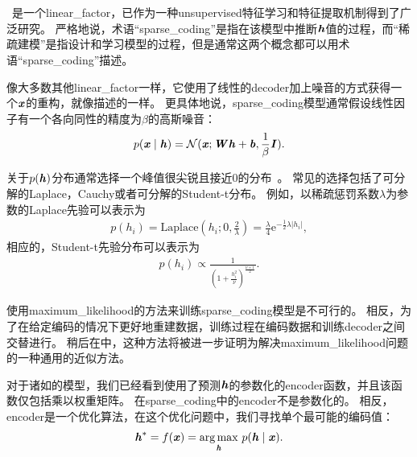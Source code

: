 \section{}
\label{sec:sparse_coding}


~\citep{Olshausen+Field-1996}是一个\gls{linear_factor}，已作为一种\gls{unsupervised}特征学习和特征提取机制得到了广泛研究。
严格地说，术语``\gls{sparse_coding}''是指在该模型中推断$\boldsymbol{\mathit{h}}$值的过程，而``稀疏建模''是指设计和学习模型的过程，但是通常这两个概念都可以用术语``\gls{sparse_coding}''描述。

像大多数其他\gls{linear_factor}一样，它使用了线性的\gls{decoder}加上噪音的方式获得一个$\boldsymbol{\mathit{x}}$的重构，就像描述的一样。
更具体地说，\gls{sparse_coding}模型通常假设线性因子有一个各向同性的精度为$\beta$的高斯噪音：
\begin{align}
\label{eqn:1312}
p(\boldsymbol{\mathit{x}}\mid \boldsymbol{\mathit{h}}) = \mathcal{N}
(\boldsymbol{\mathit{x}};\boldsymbol{\mathit{W}}\boldsymbol{\mathit{h}} + \boldsymbol{\mathit{b}} ,\frac{1}{\beta}\boldsymbol{\mathit{I}}).
\end{align}


关于$p(\boldsymbol{\mathit{h}})$分布通常选择一个峰值很尖锐且接近$0$的分布~\citep{Olshausen+Field-1996}。
常见的选择包括了可分解的Laplace，Cauchy或者可分解的Student-t分布。
例如，以稀疏惩罚系数$\lambda$为参数的Laplace先验可以表示为
\begin{align}
\label{eqn:1313}
p(h_i) = \text{Laplace}(h_i;0,\frac{2}{\lambda}) = \frac{\lambda}{4} \text{e}^{ -\frac{1}{2}\lambda \vert h_i\vert},
\end{align}
相应的，Student-t先验分布可以表示为
\begin{align}
\label{eqn:1314}
p(h_i)\propto \frac{1}{(1+\frac{h_i^2}{\nu})^{\frac{\nu+1}{2}}}.
\end{align}

使用\gls{maximum_likelihood}的方法来训练\gls{sparse_coding}模型是不可行的。
相反，为了在给定编码的情况下更好地重建数据，训练过程在编码数据和训练\gls{decoder}之间交替进行。
稍后在中，这种方法将被进一步证明为解决\gls{maximum_likelihood}问题的一种通用的近似方法。

对于诸如的模型，我们已经看到使用了预测$\boldsymbol{\mathit{h}}$的参数化的\gls{encoder}函数，并且该函数仅包括乘以权重矩阵。
在\gls{sparse_coding}中的\gls{encoder}不是参数化的。
相反，\gls{encoder}是一个优化算法，在这个优化问题中，我们寻找单个最可能的编码值：
\begin{align}
\label{eqn:1315}
\boldsymbol{\mathit{h}}^* = f(\boldsymbol{\mathit{x}}) = \underset{\boldsymbol{\mathit{h}}}{\arg\max}\  p(\boldsymbol{\mathit{h}}\mid\boldsymbol{\mathit{x}}).
\end{align}


